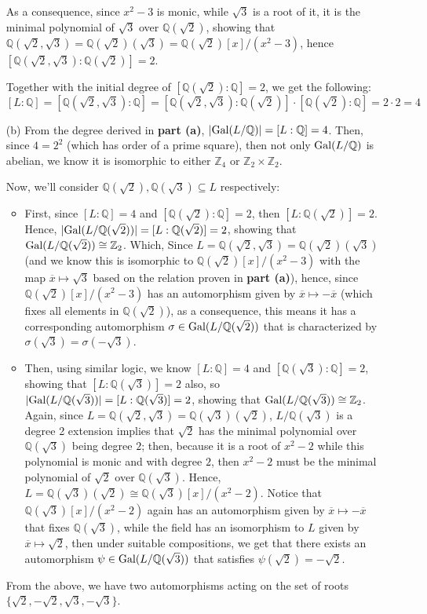 \documentclass{article}
\newcommand{\ZZ}{\mathbb{Z}}
\newcommand{\QQ}{\mathbb{Q}}
\newcommand{\Gal}{\textmd{Gal}}
\begin{document}
\begin{itemize}
    As a consequence, since $x^2-3$ is monic, while $\sqrt{3}$ is a root of it, it is the minimal polynomial of $\sqrt{3}$ over $\QQ(\sqrt{2})$, showing that $\QQ(\sqrt{2},\sqrt{3}) = \QQ(\sqrt{2})(\sqrt{3}) = \QQ(\sqrt{2})[x]/(x^2-3)$, hence $[\QQ(\sqrt{2},\sqrt{3}):\QQ(\sqrt{2})] = 2$.

    Together with the initial degree of $[\QQ(\sqrt{2}):\QQ]=2$, we get the following:
    \begin{equation}
        \label{eq:7}
        [L:\QQ]=[\QQ(\sqrt{2},\sqrt{3}):\QQ]=[\QQ(\sqrt{2},\sqrt{3}):\QQ(\sqrt{2})]\cdot [\QQ(\sqrt{2}):\QQ] = 2\cdot 2=4
    \end{equation}
    \item[(b)] From the degree derived in \textbf{part (a)}, $|\Gal(L/\QQ)| = [L:\QQ] = 4$. Then, since $4=2^2$ (which has order of a prime square), then not only $\Gal(L/\QQ)$ is abelian, we know it is isomorphic to either $\ZZ_4$ or $\ZZ_2\times \ZZ_2$.
    
    Now, we'll consider $\QQ(\sqrt{2}),\QQ(\sqrt{3})\subseteq L$ respectively: 
    \begin{itemize}
        \item First, since $[L:\QQ]=4$ and $[\QQ(\sqrt{2}):\QQ]=2$, then $[L:\QQ(\sqrt{2})] = 2$. Hence, $|\Gal(L/\QQ(\sqrt{2}))| = [L:\QQ(\sqrt{2})] = 2$, showing that $\Gal(L/\QQ(\sqrt{2}))\cong \ZZ_2$. Which, 
        Since $L=\QQ(\sqrt{2},\sqrt{3})=\QQ(\sqrt{2})(\sqrt{3})$ (and we know this is isomorphic to $\QQ(\sqrt{2})[x]/(x^2-3)$ with the map $\overline{x}\mapsto \sqrt{3}$ based on the relation proven in \textbf{part (a)}), hence, since $\QQ(\sqrt{2})[x]/(x^2-3)$ has an automorphism given by $\overline{x}\mapsto -\overline{x}$ (which fixes all elements in $\QQ(\sqrt{2})$), as a consequence, this means it has a corresponding automorphism $\sigma\in \Gal(L/\QQ(\sqrt{2}))$ that is characterized by $\sigma(\sqrt{3}) = \sigma(-\sqrt{3})$.
        \item 
        Then, using similar logic, we know $[L:\QQ]=4$ and $[\QQ(\sqrt{3}):\QQ]=2$, showing that $[L:\QQ(\sqrt{3})]=2$ also, so $|\Gal(L/\QQ(\sqrt{3}))|=[L:\QQ(\sqrt{3})] = 2$, showing that $\Gal(L/\QQ(\sqrt{3}))\cong \ZZ_2$.
        Again, since $L=\QQ(\sqrt{2},\sqrt{3}) = \QQ(\sqrt{3})(\sqrt{2})$, $L/\QQ(\sqrt{3})$ is a degree 2 extension implies that $\sqrt{2}$ has the minimal polynomial over $\QQ(\sqrt{3})$ being degree $2$; then, because it is a root of $x^2-2$ while this polynomial is monic and with degree $2$, then $x^2-2$ must be the minimal polynomial of $\sqrt{2}$ over $\QQ(\sqrt{3})$. Hence, $L=\QQ(\sqrt{3})(\sqrt{2})\cong \QQ(\sqrt{3})[x]/(x^2-2)$. Notice that $\QQ(\sqrt{3})[x]/(x^2-2)$ again has an automorphism given by $\overline{x}\mapsto -\overline{x}$ that fixes $\QQ(\sqrt{3})$, while the field has an isomorphism to $L$ given by $\overline{x}\mapsto \sqrt{2}$, then under suitable compositions, we get that there exists an automorphism $\psi\in \Gal(L/\QQ(\sqrt{3}))$ that satisfies $\psi(\sqrt{2})=-\sqrt{2}$.
    \end{itemize}
    From the above, we have two automorphisms acting on the set of roots $\{\sqrt{2},-\sqrt{2},\sqrt{3},-\sqrt{3}\}$. 
    

\end{itemize}
\end{document}
